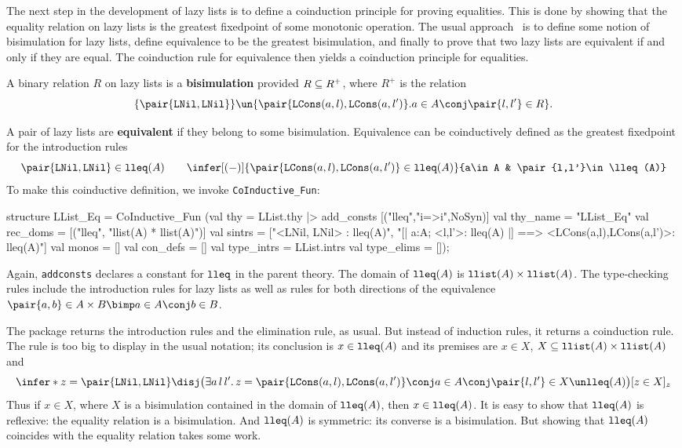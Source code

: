 The next step in the development of lazy lists is to define a coinduction
principle for proving equalities.  This is done by showing that the equality
relation on lazy lists is the greatest fixedpoint of some monotonic
operation.  The usual approach~\cite{pitts94} is to define some notion of 
bisimulation for lazy lists, define equivalence to be the greatest
bisimulation, and finally to prove that two lazy lists are equivalent if and
only if they are equal.  The coinduction rule for equivalence then yields a
coinduction principle for equalities.

A binary relation $R$ on lazy lists is a {\bf bisimulation} provided $R\subseteq
R^+$, where $R^+$ is the relation
\[ \{\pair{\LNil,\LNil}\} \un 
   \{\pair{\LCons(a,l),\LCons(a,l')} . a\in A \conj \pair{l,l'}\in R\}.
\]

A pair of lazy lists are {\bf equivalent} if they belong to some bisimulation. 
Equivalence can be coinductively defined as the greatest fixedpoint for the
introduction rules
\[  \pair{\LNil,\LNil} \in\lleq(A)  \qquad 
    \infer[(-)]{\pair{\LCons(a,l),\LCons(a,l')} \in\lleq(A)}
          {a\in A & \pair{l,l'}\in \lleq(A)}
\]
To make this coinductive definition, we invoke \verb|CoInductive_Fun|:
\begin{ttbox}
structure LList_Eq = CoInductive_Fun
 (val thy        = LList.thy |> add_consts [("lleq","i=>i",NoSyn)]
  val thy_name   = "LList_Eq"
  val rec_doms   = [("lleq", "llist(A) * llist(A)")]
  val sintrs     = 
       ["<LNil, LNil> : lleq(A)",
        "[| a:A; <l,l'>: lleq(A) |] ==> <LCons(a,l),LCons(a,l')>: lleq(A)"]
  val monos      = []
  val con_defs   = []
  val type_intrs = LList.intrs
  val type_elims = []);
\end{ttbox}
Again, {\tt addconsts} declares a constant for $\hbox{\tt lleq}$ in the parent theory. 
The domain of $\hbox{\tt lleq}(A)$ is $\hbox{\tt llist}(A)\times\hbox{\tt llist}(A)$.  The type-checking
rules include the introduction rules for lazy lists as well as rules
for both directions of the equivalence
$\pair{a,b}\in A\times B \bimp a\in A \conj b\in B$.

The package returns the introduction rules and the elimination rule, as
usual.  But instead of induction rules, it returns a coinduction rule.
The rule is too big to display in the usual notation; its conclusion is
$x\in\hbox{\tt lleq}(A)$ and its premises are $x\in X$, 
${X\subseteq\hbox{\tt llist}(A)\times\hbox{\tt llist}(A)}$ and
\[ \infer*{z=\pair{\LNil,\LNil}\disj \bigl(\exists a\,l\,l'.\,
      z=\pair{\LCons(a,l),\LCons(a,l')} \conj 
      a\in A \conj\pair{l,l'}\in X\un\lleq(A) \bigr)
    }{[z\in X]_z}
\]
Thus if $x\in X$, where $X$ is a bisimulation contained in the
domain of $\hbox{\tt lleq}(A)$, then $x\in\hbox{\tt lleq}(A)$.  It is easy to show that
$\hbox{\tt lleq}(A)$ is reflexive: the equality relation is a bisimulation.  And
$\hbox{\tt lleq}(A)$ is symmetric: its converse is a bisimulation.  But showing that
$\hbox{\tt lleq}(A)$ coincides with the equality relation takes some work.

